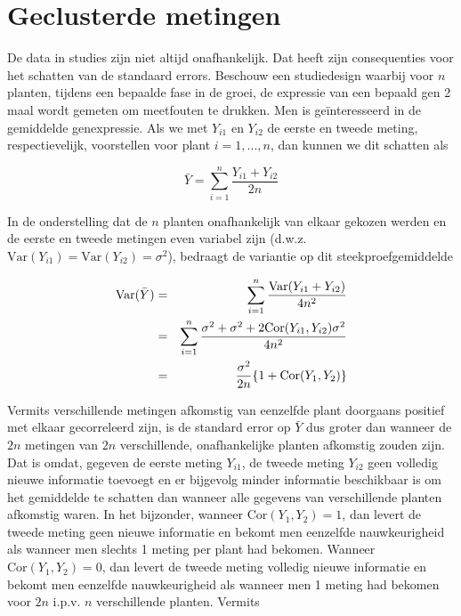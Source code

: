 \documentclass[
  12pt,dutch,coursenotes]{book}
\theoremstyle{definition}
\theoremstyle{definition}
\theoremstyle{definition}
\theoremstyle{definition}
\theoremstyle{remark}
\begin{document}
\hypertarget{geclusterde-metingen}{%
\section{Geclusterde metingen}\label{geclusterde-metingen}}

De data in studies zijn niet altijd onafhankelijk. Dat heeft zijn consequenties voor het schatten van de standaard errors.
Beschouw een studiedesign waarbij voor \(n\) planten, tijdens een bepaalde fase in de groei, de expressie van een bepaald gen 2 maal wordt gemeten om meetfouten te drukken. Men is geïnteresseerd in de gemiddelde genexpressie.
Als we met \(Y_{i1}\) en \(Y_{i2}\) de eerste en tweede meting, respectievelijk, voorstellen
voor plant \(i=1,...,n\), dan kunnen we dit schatten als

\begin{equation*}
\bar Y = \sum_{i=1}^n \frac{Y_{i1}+Y_{i2}}{2n}
\end{equation*}

In de onderstelling dat de \(n\) planten onafhankelijk van elkaar gekozen
werden en de eerste en tweede metingen even variabel zijn (d.w.z. \(\text{Var}(Y_{i1})=\text{Var}(Y_{i2})=\sigma^2\)), bedraagt de variantie op dit
steekproefgemiddelde

\begin{eqnarray*}
\text{Var}(\bar Y)&=&\sum_{i=1}^n \frac{\text{Var}(Y_{i1}+Y_{i2})}{4n^2} \\
&=&\sum_{i=1}^n \frac{\sigma^2+\sigma^2+2\text{Cor}(Y_{i1},Y_{i2})\sigma^2}{%
4n^2} \\
&=&\frac{\sigma^2}{2n}\{1+\text{Cor}(Y_{1},Y_{2})\}
\end{eqnarray*}

Vermits verschillende metingen afkomstig van eenzelfde plant doorgaans
positief met elkaar gecorreleerd zijn, is de standard error op \(\bar Y\) dus
groter dan wanneer de \(2n\) metingen van \(2n\) verschillende, onafhankelijke
planten afkomstig zouden zijn. Dat is omdat, gegeven de eerste meting \(Y_{i1}\), de tweede meting \(Y_{i2}\) geen volledig nieuwe informatie toevoegt en er bijgevolg minder informatie beschikbaar is om het gemiddelde te
schatten dan wanneer alle gegevens van verschillende planten afkomstig
waren. In het bijzonder, wanneer \(\text{Cor}(Y_{1},Y_{2})=1\), dan levert de tweede meting geen nieuwe informatie en bekomt men eenzelfde nauwkeurigheid als wanneer men slechts 1 meting per plant had bekomen. Wanneer \(\text{Cor}(Y_{1},Y_{2})=0\), dan levert de tweede meting volledig nieuwe informatie en bekomt men eenzelfde nauwkeurigheid als wanneer men 1 meting had bekomen voor \(2n\) i.p.v. \(n\) verschillende planten. Vermits
\end{document}
